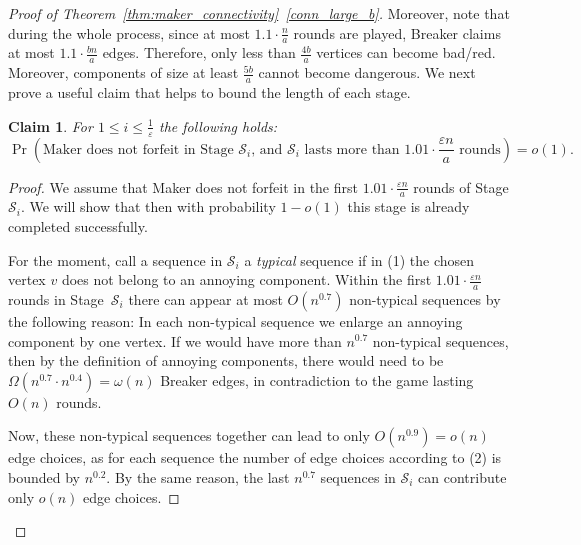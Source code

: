 \documentclass[11pt, a4paper]{article}
\numberwithin{equation}{section}
\numberwithin{figure}{section}
\newtheorem{claim}[theorem]{Claim}
\newcommand{\Prob}{\operatorname{Pr}}
\begin{document}
\begin{proof}[Proof of Theorem~\ref{thm:maker_connectivity}~\ref{conn_large_b}]
Moreover, note that during the whole process, since at most $1.1\cdot \frac{n}{a}$ rounds are played, Breaker claims at most $1.1\cdot \frac{bn}{a}$ edges. Therefore, 
only less than $\frac{4b}{a}$ vertices can become bad/red. 
Moreover, components of size at least $\frac{5b}{a}$ cannot become dangerous.
We next prove a useful claim that helps to bound the length of each stage.

\begin{claim}\label{clm:connectivity_number.rounds}
For $1 \leq i\leq \frac{1}{\varepsilon}$
the following holds:
$$
\Prob\left(\text{Maker does not forfeit in Stage $\mathcal{S}_i$, and $\mathcal{S}_i$ lasts more than $1.01\cdot \frac{\varepsilon n}{a}$ rounds} \right) = o(1).
$$
\end{claim}

\begin{proof}
We assume that Maker does not forfeit in the first $1.01\cdot \frac{\varepsilon n}{a}$ rounds of Stage 
$\mathcal{S}_i$. We will show that then with probability $1-o(1)$ this stage is already completed successfully.

For the moment, call a sequence in $\mathcal{S}_i$
a \textit{typical} sequence if in (1) the chosen vertex $v$ does not 
belong to an annoying component.
Within the first $1.01\cdot \frac{\varepsilon n}{a}$ rounds in Stage~$\mathcal{S}_i$ there can appear at most $O(n^{0.7})$ non-typical sequences by the following reason:
In each non-typical sequence we enlarge an annoying component by one vertex. If we would have more than 
$n^{0.7}$ non-typical sequences,
then by the definition of annoying components, there would need to be $\Omega(n^{0.7} \cdot n^{0.4}) = \omega(n)$ Breaker edges, in contradiction to the game lasting $O(n)$ rounds.

Now, these non-typical sequences together can lead to only $O(n^{0.9})=o(n)$ edge choices, as for each sequence the number of edge choices according to (2) is bounded by $n^{0.2}$. By the same reason, the last $n^{0.7}$ sequences in $\mathcal{S}_i$ can contribute only $o(n)$ edge choices.


\end{proof}
\end{proof}
\end{document}
